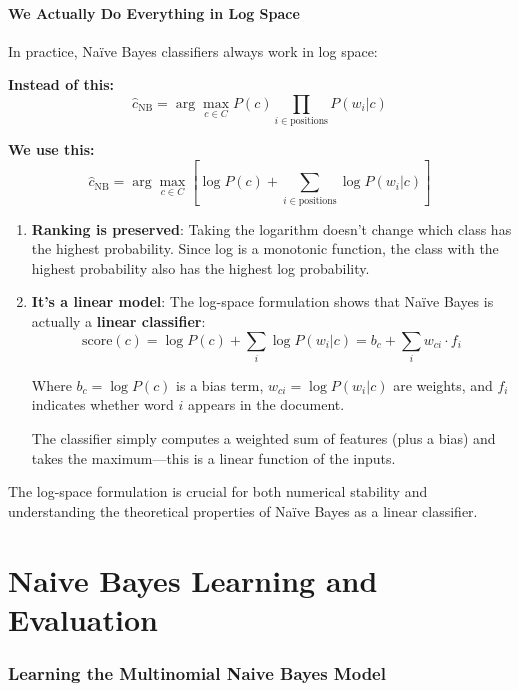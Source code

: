 \documentclass[11pt,a4paper]{article}
\theoremstyle{definition}
\theoremstyle{plain}
\theoremstyle{remark}
\begin{document}
\subsection{We Actually Do Everything in Log Space}

In practice, Naïve Bayes classifiers always work in log space:

\textbf{Instead of this:}
\[
\hat{c}_{\text{NB}} = \arg\max_{c \in C} P(c) \prod_{i \in \text{positions}} P(w_i | c)
\]

\textbf{We use this:}
\[
\hat{c}_{\text{NB}} = \arg\max_{c \in C} \left[ \log P(c) + \sum_{i \in \text{positions}} \log P(w_i | c) \right]
\]

\begin{tcolorbox}[colback=purple!5!white,colframe=purple!75!black,title=\textbf{Important Notes About Log Space}]
\begin{enumerate}
    \item \textbf{Ranking is preserved}: Taking the logarithm doesn't change which class has the highest probability. Since log is a monotonic function, the class with the highest probability also has the highest log probability.
    
    \item \textbf{It's a linear model}: The log-space formulation shows that Naïve Bayes is actually a \textbf{linear classifier}:
    \[
    \text{score}(c) = \log P(c) + \sum_{i} \log P(w_i | c) = b_c + \sum_{i} w_{ci} \cdot f_i
    \]
    
    Where $b_c = \log P(c)$ is a bias term, $w_{ci} = \log P(w_i | c)$ are weights, and $f_i$ indicates whether word $i$ appears in the document.
    
    The classifier simply computes a weighted sum of features (plus a bias) and takes the maximum—this is a linear function of the inputs.
\end{enumerate}
\end{tcolorbox}

The log-space formulation is crucial for both numerical stability and understanding the theoretical properties of Naïve Bayes as a linear classifier.



\newpage

\part{Naive Bayes Learning and Evaluation}

\section{Learning the Multinomial Naive Bayes Model}
\end{document}
